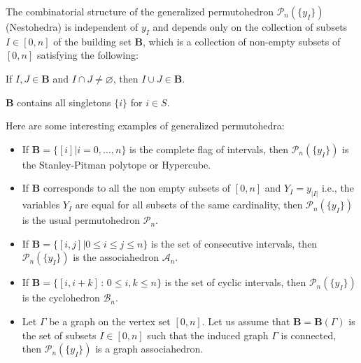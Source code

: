 \documentclass[hidelinks,12pt]{article}
\begin{document}
The combinatorial structure of the generalized permutohedron ${\mathscr P_n(\{y_I\})}$ (Nestohedra) is independent of $y_I$ and depends only on the collection of subsets $I \in [0,n]$ of the  building set ${\mathbf B}$, which is 
a collection of non-empty subsets of $[0,n]$ satisfying the following: %
\begin{compactenum}[\quad (1)]
    \item If $I,J \in {\mathbf B}$ and $I \cap J \neq \varnothing $, then $I \cup J \in {\mathbf B}$.
    \item ${\mathbf B}$ contains all singletons $\{ i\}$ for $i \in S$.
\end{compactenum}
Here are some interesting examples of generalized permutohedra:
\begin{itemize}
    \item  If ${\mathbf B}= \{[i] | i=0,\dots,n \}$ is the complete flag of intervals, then ${\mathscr P_n(\{y_I\})}$ is the Stanley-Pitman polytope or Hypercube.
    \item If ${\mathbf B}$ corresponds to all the non empty subsets of $[0,n]$ and $Y_I =y_{|I|}$ i.e., the variables $Y_I$ are equal for all subsets of the same cardinality, then ${\mathscr P_n(\{y_I\})}$ is the usual permutohedron ${\mathscr P_n}$. 
    \item If ${\mathbf B}=\{ [i,j] | 0\leq  i \leq j \leq n\}$ is the set of consecutive intervals, then ${\mathscr P_n(\{y_I\})}$ is the associahedron ${\mathscr A_n}$. 
    \item If  $\mathbf B=\{[i,i+k]\,:\,0\leq i, k\leq n\}$ is the set of cyclic intervals, then ${\mathscr P_n(\{y_I\})}$ is the cyclohedron ${\mathscr B_n}$.
    \item Let $\Gamma$ be a graph on the vertex set $[0,n]$. Let us assume that ${\mathbf B} = {\mathbf B}(\Gamma)$ is the set of subsets $I \in [0,n]$ such that the induced graph $\Gamma$ is connected, then  ${\mathscr P_n(\{y_I\})}$ is a graph associahedron.
\end{itemize}
\end{document}
